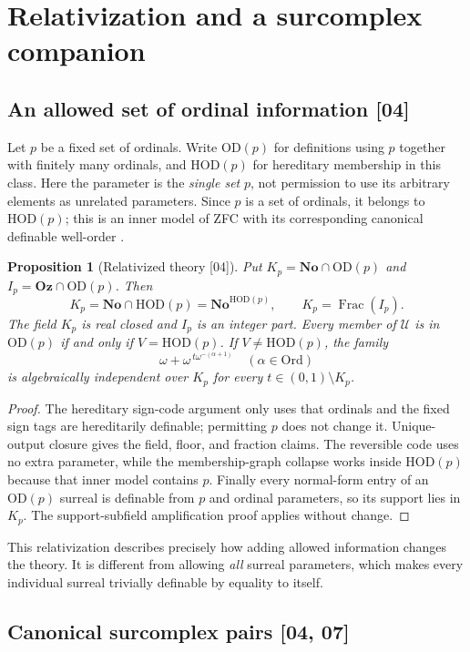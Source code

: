 \documentclass[11pt,a4paper]{article}
\numberwithin{equation}{section}
\newtheorem{proposition}[proposition]{Proposition}
\theoremstyle{definition}
\theoremstyle{remark}
\newcommand{\No}{\mathbf{No}}
\newcommand{\Oz}{\mathbf{Oz}}
\newcommand{\Ord}{\mathrm{Ord}}
\newcommand{\OD}{\mathrm{OD}}
\newcommand{\HOD}{\mathrm{HOD}}
\newcommand{\Frac}{\operatorname{Frac}}
\newcommand{\Cell}{\mathcal U}
\newcommand{\src}[1]{\textup{\textsf{\small[#1]}}}
\begin{document}
\section{Relativization and a surcomplex companion}
\label{dsn:sec:relativize}

\subsection{An allowed set of ordinal information \src{04}}

Let $p$ be a fixed set of ordinals. Write $\OD(p)$ for definitions
using $p$ together with finitely many ordinals, and $\HOD(p)$ for
hereditary membership in this class. Here the parameter is the
\emph{single set} $p$, not permission to use its arbitrary elements
as unrelated parameters. Since $p$ is a set of ordinals, it belongs
to $\HOD(p)$; this is an inner model of ZFC with its corresponding
canonical definable well-order \cite{Jech}.

\begin{proposition}[Relativized theory \src{04}]\label{dsn:prop:relative}
Put $K_p=\No\cap\OD(p)$ and $I_p=\Oz\cap\OD(p)$. Then
\[
 K_p=\No\cap\HOD(p)=\No^{\HOD(p)},\qquad
 K_p=\Frac(I_p).
\]
The field $K_p$ is real closed and $I_p$ is an integer part.
Every member of $\Cell$ is in $\OD(p)$ if and only if
$V=\HOD(p)$. If $V\ne\HOD(p)$, the family
\[
 \omega+\omega^{\,t\omega^{-(\alpha+1)}}\quad(\alpha\in\Ord)
\]
is algebraically independent over $K_p$ for every
$t\in(0,1)\setminus K_p$.
\end{proposition}
\begin{proof}
The hereditary sign-code argument only uses that ordinals and the
fixed sign tags are hereditarily definable; permitting $p$ does not
change it. Unique-output closure gives the field, floor, and fraction
claims. The reversible code uses no extra parameter, while the
membership-graph collapse works inside $\HOD(p)$ because that inner
model contains $p$. Finally every normal-form entry of an
$\OD(p)$ surreal is definable from $p$ and ordinal parameters, so
its support lies in $K_p$. The support-subfield amplification proof
applies without change.
\end{proof}

This relativization describes precisely how adding allowed information
changes the theory. It is different from allowing \emph{all} surreal
parameters, which makes every individual surreal trivially definable
by equality to itself.

\subsection{Canonical surcomplex pairs \src{04, 07}}
\end{document}
